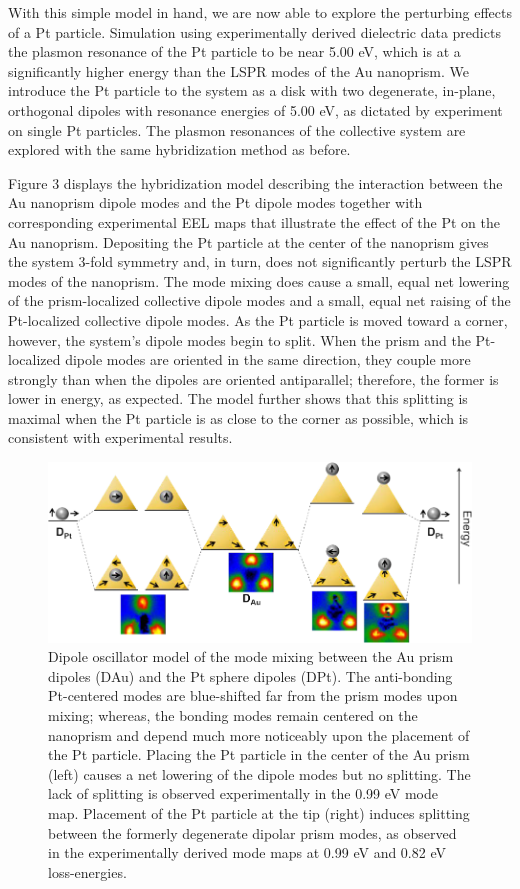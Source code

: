 \documentclass [11pt, proquest] {uwthesis}[2016/11/22]
\begin{document}
With this simple model in hand, we are now able to explore the perturbing effects of a Pt particle. Simulation using experimentally derived dielectric data\cite{Weaver} predicts the plasmon resonance of the Pt particle to be near 5.00 eV, which is at a significantly higher energy than the LSPR modes of the Au nanoprism. We introduce the Pt particle to the system as a disk with two degenerate, in-plane, orthogonal dipoles with resonance energies of 5.00 eV, as dictated by experiment on single Pt particles. The plasmon resonances of the collective system are explored with the same hybridization method as before.

Figure 3 displays the hybridization model describing the interaction between the Au nanoprism dipole modes and the Pt dipole modes together with corresponding experimental EEL maps that illustrate the effect of the Pt on the Au nanoprism. Depositing the Pt particle at the center of the nanoprism gives the system 3-fold symmetry and, in turn, does not significantly perturb the LSPR modes of the nanoprism. The mode mixing does cause a small, equal net lowering of the prism-localized collective dipole modes and a small, equal net raising of the Pt-localized collective dipole modes. As the Pt particle is moved toward a corner, however, the system’s dipole modes begin to split. When the prism and the Pt-localized dipole modes are oriented in the same direction, they couple more strongly than when the dipoles are oriented antiparallel; therefore, the former is lower in energy, as expected\cite{Quillin}. The model further shows that this splitting is maximal when the Pt particle is as close to the corner as possible, which is consistent with experimental results.

\begin{figure}
\begin{centering}
\includegraphics{prisms_theory.png}
\caption{Dipole oscillator model of the mode mixing between the Au prism dipoles (DAu) and the Pt sphere dipoles (DPt). The anti-bonding Pt-centered modes are blue-shifted far from the prism modes upon mixing; whereas, the bonding modes remain centered on the nanoprism and depend much more noticeably upon the placement of the Pt particle. Placing the Pt particle in the center of the Au prism (left) causes a net lowering of the dipole modes but no splitting. The lack of splitting is observed experimentally in the 0.99 eV mode map. Placement of the Pt particle at the tip (right) induces splitting between the formerly degenerate dipolar prism modes, as observed in the experimentally derived mode maps at 0.99 eV and 0.82 eV loss-energies.}
\label{mo_diagram}
\end{centering}
\end{figure}
\end{document}
